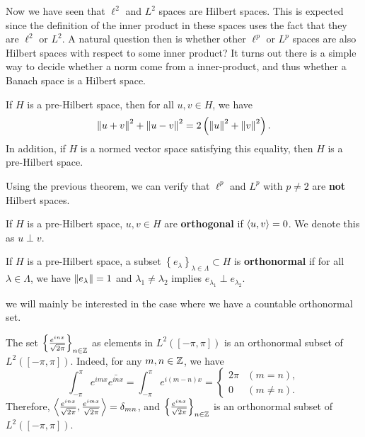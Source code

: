 \documentclass[a4paper]{article}
\begin{document}
Now we have seen that $\ell^2$ and $L^2$ spaces are 
Hilbert spaces. This is expected since the definition 
of the inner product in these spaces uses the fact 
that they are $\ell^2$ or $L^2$. 
A natural question then is whether
other $\ell^p$ or $L^p$ spaces are also Hilbert spaces
with respect to some inner product?
It turns out there is a simple way to decide whether a 
norm come from a inner-product, and thus whether a 
Banach space is a Hilbert space. 

\begin{thm}
If $H$ is a pre-Hilbert space, then for all $u, v \in H$, 
we have 
\[
  \left\lVert u + v\right\rVert^2 + \left\lVert u - v\right\rVert^2 = 2 \left( \left\lVert u\right\rVert^2 
  + \left\lVert v\right\rVert^2 \right).
\]
In addition, if $H$ is a normed vector space satisfying this 
equality, then $H$ is a pre-Hilbert space.
\end{thm}

Using the previous theorem, we can verify that 
$\ell^p$ and $L^p$ with $p \neq 2$ are \textbf{not} 
Hilbert spaces.

\begin{defi}[Orthogonal]
  If $H$ is a pre-Hilbert space, $u, v \in H$ are 
  \textbf{orthogonal} if $\left\langle u, v \right\rangle = 0$. 
  We denote this as $u \perp v$.
\end{defi}

\begin{defi}
  If $H$ is a pre-Hilbert space, a subset $\left\{ e_\lambda 
  \right\}_{\lambda \in \Lambda} \subset H$ is 
  \textbf{orthonormal} if for all $\lambda \in \Lambda$,
  we have $\left\lVert e_\lambda\right\rVert = 1$ and $\lambda_1 \neq \lambda_2$
  implies $e_{\lambda_1} \perp e_{\lambda_2}$.
\end{defi}

\begin{remark}
  we will mainly be interested in the case where we have a 
  countable orthonormal set.
\end{remark}

\begin{eg}
  The set $\left\{ \frac{e^{i n x}}{\sqrt{2\pi}} \right\}_{n \in \mathbb{Z}}$
  as elements in $L^2([-\pi, \pi])$ 
  is an orthonormal subset of $L^2([-\pi, \pi])$. 
  Indeed, for any $m, n \in \mathbb{Z}$, we have 
  \[
  \int_{-\pi}^\pi e^{imx} \bar{e^{inx}} 
  = \int_{-\pi}^\pi e^{i(m - n)x}
  = \begin{cases}
    2 \pi & (m = n), \\
    0 & (m \neq n).
  \end{cases}
  \]
  Therefore, $\left\langle \frac{e^{inx}}{\sqrt{2\pi}}, \frac{e^{imx}}
  {\sqrt{2\pi}} \right\rangle = \delta_{mn}$, and $\left\{ \frac{e^{i n x}}{\sqrt{2\pi}}
  \right\}_{n \in \mathbb{Z}}$ is an orthonormal subset 
  of $L^2([-\pi, \pi])$.
\end{eg}
\end{document}
